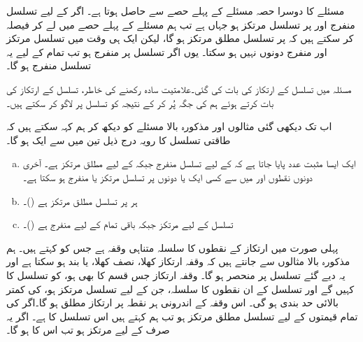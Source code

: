 مسئلے کا دوسرا حصہ مسئلے کے پہلے حصے  سے حاصل ہوتا ہے۔ اگر  کے لیے تسلسل منفرج اور  پر تسلسل مرتکز ہو جہاں  ہے تب ہم مسئلے کے پہلے حصے میں  لے کر فیصلہ کر سکتے ہیں کہ  پر تسلسل مطلق مرتکز ہو گا، لیکن ایک ہی وقت میں تسلسل مرتکز اور منفرج دونوں  نہیں ہو سکتا۔ یوں اگر تسلسل  پر منفرج ہو تب تمام  کے لیے یہ تسلسل   منفرج ہو گا۔

مسئلہ  میں تسلسل   کے ارتکاز کی بات کی گئی۔علامتیت  سادہ رکھنے کی خاطر، تسلسل  کے ارتکاز کی بات کرتے ہوئے ہم  کی جگہ  پُر کر کے نتیجہ کو تسلسل  پر لاگو کر سکتے ہیں۔

اب تک دیکھی  گئی مثالوں اور مذکورہ بالا مسئلے کو دیکھ کر ہم کہہ سکتے ہیں کہ طاقتی تسلسل کا رویہ درج ذیل تین  میں سے ایک ہو گا۔

\begin{enumerate}[a.]
\item
ایک ایسا مثبت عدد  پایا جاتا ہے کہ  کے لیے تسلسل منفرج جبکہ  کے لیے مطلق مرتکز ہے۔  آخری دونوں  نقطوں  اور   میں  سے کسی ایک  یا دونوں  پر تسلسل مرتکز یا منفرج ہو سکتا ہے۔ 
\item
ہر  پر تسلسل مطلق مرتکز ہے ()۔
\item
تسلسل  کے لیے مرتکز جبکہ باقی تمام  کے لیے منفرج ہے ()۔
\end{enumerate}

پہلی صورت میں ارتکاز کے نقطوں کا سلسلہ متناہی وقفہ ہے جس کو  کہتے ہیں۔ ہم مذکورہ بالا مثالوں سے جانتے ہیں کہ وقفہ ارتکاز کھلا، نصف کھلا، یا بند ہو سکتا ہے اور یہ دیے گئے تسلسل پر منحصر ہو گا۔ وقفہ ارتکاز جس قسم کا بھی ہو،  کو تسلسل کا  کہیں گے اور تسلسل کے ان نقطوں کا سلسلہ، جن کے لیے تسلسل مرتکز ہو، کی  کمتر بالائی حد بندی   ہو گی۔ اس وقفہ کے اندرونی ہر نقطہ پر ارتکاز مطلق ہو گا۔اگر  کی تمام  قیمتوں کے لیے  تسلسل مطلق مرتکز ہو تب ہم کہتے ہیں اس تسلسل کا  ہے۔ اگر یہ صرف  کے لیے مرتکز ہو تب اس کا  ہو گا۔ 


